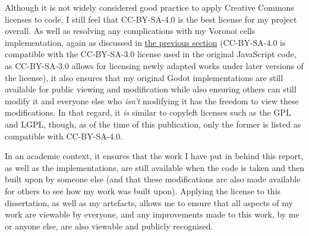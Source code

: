 Although it is not widely considered good practice to apply Creative Commons licenses to code\cite{cc_faq_code}, I still feel that CC-BY-SA-4.0 is the best license for my project overall. As well as resolving any complications with my Voronoi cells implementation, again as discussed in \hyperref[howuse]{the previous section} (CC-BY-SA-4.0 is compatible with the CC-BY-SA-3.0 license used in the original JavaScript code, as CC-BY-SA-3.0 allows for licensing newly adapted works under later versions of the license\cite{cc_compat}), it also ensures that my original Godot implementations are still available for public viewing and modification while also ensuring others can still modify it and everyone else who \textit{isn't} modifying it has the freedom to view these modifications. In that regard, it \textit{is} similar to copyleft licenses such as the GPL and LGPL, though, as of the time of this publication, only the former is listed as compatible with CC-BY-SA-4.0.\cite{cc_compat}

In an academic context, it ensures that the work I have put in behind this report, as well as the implementations, are still available when the code is taken and then built upon by someone else (and that these modifications are also made available for others to see how my work was built upon). Applying the license to this dissertation, as well as my artefacts, allows me to ensure that all aspects of my work are viewable by everyone, and any improvements made to this work, by me or anyone else, are also viewable and publicly recognised.
